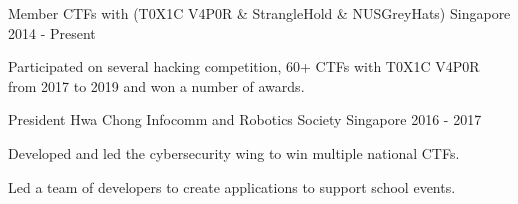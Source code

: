 

\begin{cventries}

  \cventry
    {Member} %
    {CTFs with (T0X1C V4P0R \& StrangleHold \& NUSGreyHats)} %
    {Singapore} %
    {2014 - Present} %
    {
      \begin{cvitems} %
        \item {Participated on several hacking competition, 60+ CTFs with T0X1C V4P0R from 2017 to 2019 and won a number of awards.}
      \end{cvitems}
    }

  \cventry
    {President} %
    {Hwa Chong Infocomm and Robotics Society} %
    {Singapore} %
    {2016 - 2017} %
    {
      \begin{cvitems} %
        \item {Developed and led the cybersecurity wing to win multiple national CTFs.}
        \item {Led a team of developers to create applications to support school events.}
      \end{cvitems}
    }

\end{cventries}
